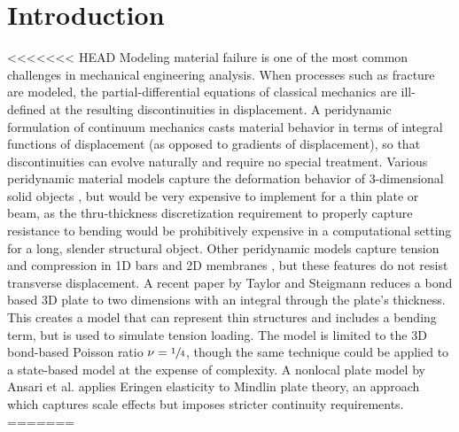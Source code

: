 \documentclass[preprint,review,12pt]{elsarticle}
\begin{document}
\section{Introduction}
<<<<<<< HEAD
Modeling material failure is one of the most common challenges in mechanical engineering analysis. When processes such as fracture are modeled, the partial-differential equations of classical mechanics are ill-defined at the resulting discontinuities in displacement.  A peridynamic formulation of continuum mechanics casts material behavior in terms of integral functions of displacement (as opposed to gradients of displacement), so that discontinuities can evolve naturally and require no special treatment.  Various peridynamic material models capture the deformation behavior of 3-dimensional solid objects \cite{silling2007peridynamic, silling2005meshfree, gerstle2007peridynamic}, but would be very expensive to implement for a thin plate or beam, as the thru-thickness discretization requirement to properly capture resistance to bending would be prohibitively expensive in a computational setting for a long, slender structural object.  Other peridynamic models capture tension and compression in 1D bars \cite{silling2003deformation} and 2D membranes \cite{silling2005peridynamic}, but these features do not resist transverse displacement.  A recent paper by Taylor and Steigmann \cite{taylor2013two} reduces a bond based 3D plate to two dimensions with an integral through the plate's thickness.  This creates a model that can represent thin structures and includes a bending term, but is used to simulate tension loading.  The model is limited to the 3D bond-based Poisson ratio \(\nu=\sfrac{1}{4}\), though the same technique could be applied to a state-based model at the expense of complexity.
A nonlocal plate model by Ansari et al. \cite{ansari2010nonlocal} applies Eringen elasticity to Mindlin plate theory, an approach which captures scale effects but imposes stricter continuity requirements.
=======
\end{document}
